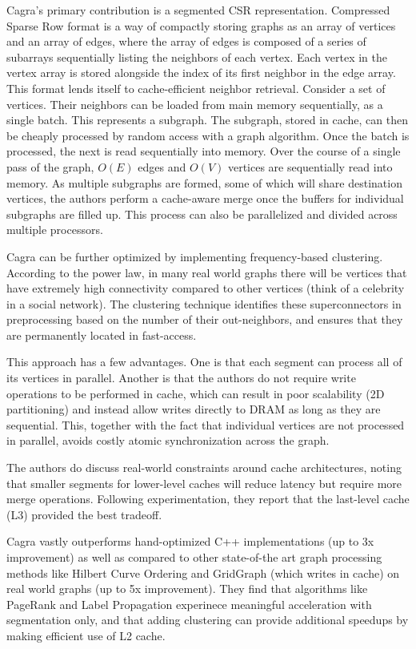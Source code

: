 Cagra's primary contribution is a segmented CSR representation. Compressed Sparse Row format is a way of compactly storing graphs as an array of vertices and an array of edges, where the array of edges is composed of a series of subarrays sequentially listing the neighbors of each vertex. Each vertex in the vertex array is stored alongside the index of its first neighbor in the edge array. This format lends itself to cache-efficient neighbor retrieval. Consider a set of vertices. Their neighbors can be loaded from main memory sequentially, as a single batch. This represents a subgraph. The subgraph, stored in cache, can then be cheaply processed by random access with a graph algorithm. Once the batch is processed, the next is read sequentially into memory. Over the course of a single pass of the graph, $O(E)$ edges and $O(V)$ vertices are sequentially read into memory. As multiple subgraphs are formed, some of which will share destination vertices, the authors perform a cache-aware merge once the buffers for individual subgraphs are filled up. This process can also be parallelized and divided across multiple processors.

Cagra can be further optimized by implementing frequency-based clustering. According to the power law, in many real world graphs there will be vertices that have extremely high connectivity compared to other vertices (think of a celebrity in a social network). The clustering technique identifies these superconnectors in preprocessing based on the number of their out-neighbors, and ensures that they are permanently located in fast-access.

This approach has a few advantages. One is that each segment can process all of its vertices in parallel. Another is that the authors do not require write operations to be performed in cache, which can result in poor scalability (2D partitioning) and instead allow writes directly to DRAM as long as they are sequential. This, together with the fact that individual vertices are not processed in parallel, avoids costly atomic synchronization across the graph. 

The authors do discuss real-world constraints around cache architectures, noting that smaller segments for lower-level caches will reduce latency but require more merge operations. Following experimentation, they report that the last-level cache (L3) provided the best tradeoff.

Cagra vastly outperforms hand-optimized C++ implementations (up to 3x improvement) as well as compared to other state-of-the art graph processing methods like Hilbert Curve Ordering and GridGraph (which writes in cache) on real world graphs (up to 5x improvement). They find that algorithms like PageRank and Label Propagation experinece meaningful acceleration with segmentation only, and that adding clustering can provide additional speedups by making efficient use of L2 cache.

